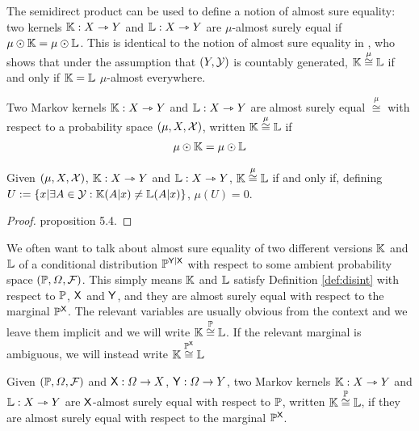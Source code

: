 The semidirect product can be used to define a notion of almost sure equality: two kernels $\mathbb{K}:X\rightarrowtriangle Y$ and $\mathbb{L}:X\rightarrowtriangle Y$ are $\mu$-almost surely equal if $\mu\odot \mathbb{K}=\mu\odot \mathbb{L}$. This is identical to the notion of almost sure equality in \citet{cho_disintegration_2019}, who shows that under the assumption that $(Y,\mathcal{Y})$ is countably generated, $\mathbb{K}\overset{\mu}{\cong}\mathbb{L}$ if and only if $\mathbb{K}=\mathbb{L}$ $\mu$-almost everywhere.

\begin{definition}\label{def:asequal_pspace}
Two Markov kernels $\mathbb{K}:X\rightarrowtriangle Y$ and $\mathbb{L}:X\rightarrowtriangle Y$ are almost surely equal $\overset{\mu}{\cong}$ with respect to a probability space $(\mu,X,\mathcal{X})$, written $\mathbb{K}\overset{\mu}{\cong}\mathbb{L}$ if
\begin{align}
    \mu\odot \mathbb{K}=\mu\odot \mathbb{L}
\end{align}
\end{definition}

\begin{theorem}
Given $(\mu,X,\mathcal{X})$, $\mathbb{K}:X\rightarrowtriangle Y$ and $\mathbb{L}:X\rightarrowtriangle Y$, $\mathbb{K}\overset{\mu}{\cong}\mathbb{L}$ if and only if, defining $U:=\{x|\exists A\in\mathcal{Y}: \mathbb{K}(A|x)\neq\mathbb{L}(A|x)\}$, $\mu(U)=0$.
\end{theorem}

\begin{proof}
\citet{cho_disintegration_2019} proposition 5.4.
\end{proof}

We often want to talk about almost sure equality of two different versions $\mathbb{K}$ and $\mathbb{L}$ of a conditional distribution $\mathbb{P}^{\mathsf{Y}|\mathsf{X}}$ with respect to some ambient probability space $(\mathbb{P},\Omega,\mathcal{F})$. This simply means $\mathbb{K}$ and $\mathbb{L}$ satisfy Definition \ref{def:disint} with respect to $\mathbb{P}$, $\mathsf{X}$ and $\mathsf{Y}$, and they are almost surely equal with respect to the marginal $\mathbb{P}^{\mathsf{X}}$. The relevant variables are usually obvious from the context and we leave them implicit and we will write $\mathbb{K}\overset{\mathbb{P}}{\cong}\mathbb{L}$. If the relevant marginal is ambiguous, we will instead write $\mathbb{K}\overset{\mathbb{P}^{\mathsf{X}}}{\cong}\mathbb{L}$

\begin{definition}
Given $(\mathbb{P},\Omega,\mathcal{F})$ and $\mathsf{X}:\Omega\to X$, $\mathsf{Y}:\Omega\to Y$, two Markov kernels $\mathbb{K}:X\rightarrowtriangle Y$ and $\mathbb{L}:X\rightarrowtriangle Y$ are $\mathsf{X}$-almost surely equal with respect to $\mathbb{P}$, written $\mathbb{K}\overset{\mathbb{P}}{\cong}\mathbb{L}$, if they are almost surely equal with respect to the marginal $\mathbb{P}^{\mathsf{X}}$.
\end{definition}

